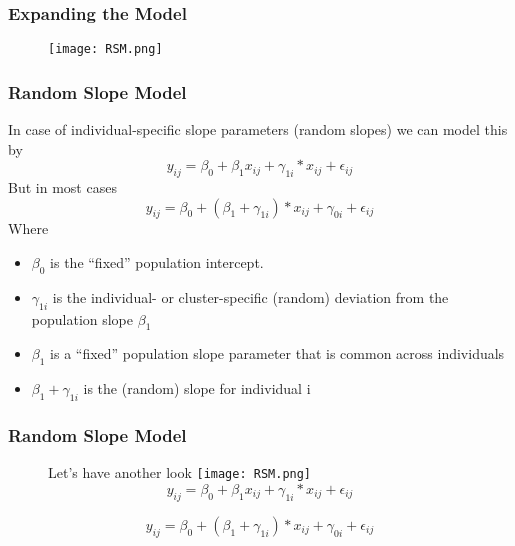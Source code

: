 \documentclass{beamer}
\begin{document}

\begin{frame}
\frametitle{Expanding the Model}
 \begin{figure}
	
	\texttt{[image: RSM.png]}

\end{figure}

\end{frame}

\begin{frame}
\frametitle{Random Slope Model}
In case of individual-specific slope parameters (random slopes) we can model this by
	\begin{equation}
y_{ij}=\beta_0+\beta_1x_{ij}+\gamma_{1i}*x_{ij}+\epsilon_{ij}
\end{equation}
But in most cases
	\begin{equation}
y_{ij}=\beta_0+(\beta_1+\gamma_{1i})*x_{ij}+\gamma_{0i}+\epsilon_{ij}
\end{equation}
Where
\begin{itemize}
	\item $\beta_0$ is the “fixed” population intercept.
	\item $\gamma_{1i}$ is the individual- or cluster-specific (random) deviation from the population slope $\beta_1$
	\item $\beta_1$ is a “fixed” population slope parameter that is common across
	individuals
	\item $\beta_1+\gamma_{1i}$ is the (random) slope for individual i 
\end{itemize}	
\end{frame}
\begin{frame}
\frametitle{Random Slope Model}
\begin{figure}
	Let's have another look
	\texttt{[image: RSM.png]}
	\begin{equation}
	y_{ij}=\beta_0+\beta_1x_{ij}+\gamma_{1i}*x_{ij}+\epsilon_{ij}
	\end{equation}

	\begin{equation}
	y_{ij}=\beta_0+(\beta_1+\gamma_{1i})*x_{ij}+\gamma_{0i}+\epsilon_{ij}
	\end{equation}
\end{figure}

\end{frame}
\end{document}
